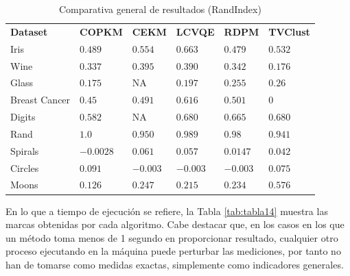 \begin{table}[!h]
	\centering
	\setlength{\arrayrulewidth}{1mm}
	\setlength{\tabcolsep}{9pt}
	\renewcommand{\arraystretch}{0.8}
	
	\begin{tabular}{ >{\centering\arraybackslash}m{2.5cm}  >{\centering\arraybackslash}m{1.2cm}>{\centering\arraybackslash}m{1.1cm}>{\centering\arraybackslash}m{1.1cm}>{\centering\arraybackslash}m{1.1cm}>{\centering\arraybackslash}m{1.3cm}}
		\hline
		\rowcolor{black}
		\multicolumn{6}{c}{\bf \color{white}{Comparativa General de Resultados (RandIndex)}}\\
		\hline
		\rowcolor{gray!50}
		\textbf{Dataset} & \textbf{COPKM} & \textbf{CEKM} & \textbf{LCVQE} & \textbf{RDPM} & \textbf{TVClust}  \\
		Iris & $0.489$  & $0.554 $ & $0.663 $ & $0.479 $ & $0.532 $ \\
		Wine & $0.337$  & $0.395 $ & $0.390 $ & $0.342 $ & $0.176 $ \\
		Glass & $0.175$  & NA & $0.197 $ & $0.255 $ & $0.26 $ \\
		Breast Cancer & $0.45$ & $0.491 $ & $0.616 $ & $0.501 $ & $0 $ \\
		Digits & $0.582$ & NA & $0.680 $ & $0.665 $ & $0.680 $ \\
		Rand & $1.0$ & $0.950 $ & $0.989 $ & $0.98 $ & $0.941 $ \\
		Spirals & $-0.0028$ & $0.061 $ & $0.057 $ & $0.0147 $ & $0.042 $ \\
		Circles & $0.091$  & $-0.003 $ & $-0.003 $ & $-0.003 $ & $0.075 $ \\
		Moons & $0.126$  & $0.247 $ & $0.215$ & $0.234 $ & $0.576 $ \\
		\hline
		
	\end{tabular}
	\caption{Comparativa general de resultados (RandIndex)}
	\label{tab:tabla13}
\end{table}

En lo que a tiempo de ejecución se refiere, la Tabla \ref{tab:tabla14} muestra las marcas obtenidas por cada algoritmo. Cabe destacar que, en los casos en los que un método toma menos de 1 segundo en proporcionar resultado, cualquier otro proceso ejecutando en la máquina puede perturbar las mediciones, por tanto no han de tomarse como medidas exactas, simplemente como indicadores generales.

